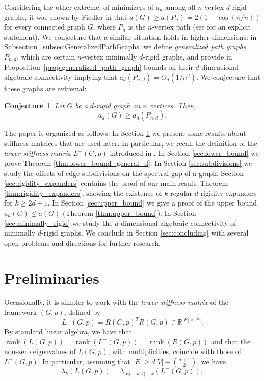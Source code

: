\documentclass[a4paper,11pt]{article}
\theoremstyle{plain}
\newtheorem{conjecture}[theorem]{\bf Conjecture}
\theoremstyle{definition}
\newcommand{\Rea}{{\mathbb R}}
\DeclareMathOperator{\rank}{\text{rank}}
\begin{document}
Considering the other extreme, of minimizers of $a_d$ among all $n$-vertex $d$-rigid graphs,  it was shown by Fiedler in \cite{fiedler1973algebraic} that $a(G)\geq a(P_n)=2(1-\cos(\pi/n))$ for every connected graph $G$, where $P_n$ is the $n$-vertex path 
(see \cite{grone1990laplacian} for an explicit statement). We conjecture that a similar situation holds in higher dimensions: in Subsection~\ref{subsec:GeneralizedPathGraphs} we define \emph{generalized path graphs} $P_{n,d}$, which are certain $n$-vertex minimally $d$-rigid graphs, and provide in Proposition~\ref{prop:generalized_path_graph} bounds on their $d$-dimensional algebraic connectivity implying that 
$a_d(P_{n,d})=\Theta_d(1/n^2)$. We conjecture that these graphs are extremal:
\begin{conjecture}\label{conj:minimal_spectral_gap_obtained_by_paths}
Let $G$ be a $d$-rigid graph on $n$ vertices. Then,
\[
    a_d(G)\geq a_d(P_{n,d}).
\]
\end{conjecture}


The paper is organized as follows: In Section \ref{sec:prelims} we present some results about stiffness matrices that are used later. In particular, we recall the definition of the \emph{lower stiffness matrix} $L^{-}(G,p)$ introduced in \cite{lew2022d}. In Section \ref{sec:lower_bound} we prove Theorem \ref{thm:lower_bound_general_d}. In Section \ref{sec:subdivisions} we study the effects of edge subdivisions on the spectral gap of a graph. Section \ref{sec:rigidity_expanders} contains the proof of our main result, Theorem \ref{thm:rigidity_expanders}, showing the existence of $k$-regular $d$-rigidity expanders for $k\geq 2d+1$. In Section \ref{sec:upper_bound} we give a proof of the upper bound $a_d(G)\leq a(G)$ (Theorem \ref{thm:upper_bound}). In Section \ref{sec:minimally_rigid} we study the $d$-dimensional algebraic connectivity of minimally $d$-rigid graphs. We conclude in Section \ref{sec:concluding} with several open problems and directions for further research.


\section{Preliminaries}\label{sec:prelims}

Occasionally, it is simpler to work with the \emph{lower stiffness matrix} of the framework $(G,p)$, defined by
\[
    L^{-}(G,p)=R(G,p)^T R(G,p) \in \Rea^{|E|\times |E|}.
\] 
By standard linear algebra, we have that $\rank(L(G,p))=\rank(L^{-}(G,p))=\rank(R(G,p))$ and that the non-zero eigenvalues  of $L(G,p)$, with multiplicities, coincide with those of $L^{-}(G,p)$. In particular, assuming that $|E|\geq d|V|-\binom{d+1}{2}$, we have
\begin{equation}\label{eqn:lam_k}
    \lambda_{k}(L(G,p))= \lambda_{|E|-d|V|+k}(L^{-}(G,p)),
\end{equation}
\end{document}
